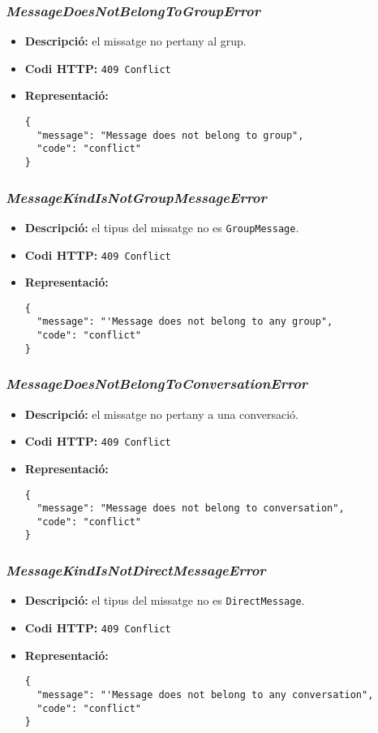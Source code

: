 \subsubsection{\emph{MessageDoesNotBelongToGroupError}}
\begin{itemize}
	\item \textbf{Descripció:} el missatge no pertany al grup.
	\item \textbf{Codi \ac{HTTP}:} \texttt{409 Conflict}
	\item \textbf{Representació:}
\begin{verbatim}
{
  "message": "Message does not belong to group",
  "code": "conflict"
}
\end{verbatim}
\end{itemize}
\subsubsection{\emph{MessageKindIsNotGroupMessageError}}
\begin{itemize}
	\item \textbf{Descripció:} el tipus del missatge no es \texttt{GroupMessage}.
	\item \textbf{Codi \ac{HTTP}:} \texttt{409 Conflict}
	\item \textbf{Representació:}
\begin{verbatim}
{
  "message": "'Message does not belong to any group",
  "code": "conflict"
}
\end{verbatim}
\end{itemize}

\subsubsection{\emph{MessageDoesNotBelongToConversationError}}
\begin{itemize}
	\item \textbf{Descripció:} el missatge no pertany a una conversació.
	\item \textbf{Codi \ac{HTTP}:} \texttt{409 Conflict}
	\item \textbf{Representació:}
\begin{verbatim}
{
  "message": "Message does not belong to conversation",
  "code": "conflict"
}
\end{verbatim}
\end{itemize}

\subsubsection{\emph{MessageKindIsNotDirectMessageError}}
\begin{itemize}
	\item \textbf{Descripció:} el tipus del missatge no es \texttt{DirectMessage}.
	\item \textbf{Codi \ac{HTTP}:} \texttt{409 Conflict}
	\item \textbf{Representació:}
\begin{verbatim}
{
  "message": "'Message does not belong to any conversation",
  "code": "conflict"
}
\end{verbatim}
\end{itemize}


